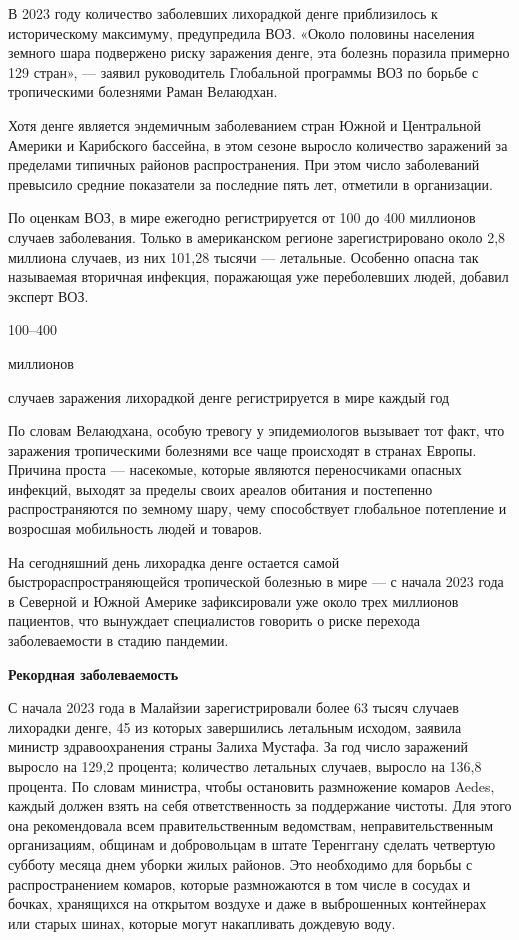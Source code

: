 В 2023 году количество заболевших лихорадкой денге приблизилось к историческому максимуму, предупредила ВОЗ. «Около половины населения земного шара подвержено риску заражения денге, эта болезнь поразила примерно 129 стран», — заявил руководитель Глобальной программы ВОЗ по борьбе с тропическими болезнями Раман Велаюдхан.

Хотя денге является эндемичным заболеванием стран Южной и Центральной Америки и Карибского бассейна, в этом сезоне выросло количество заражений за пределами типичных районов распространения. При этом число заболеваний превысило средние показатели за последние пять лет, отметили в организации.

По оценкам ВОЗ, в мире ежегодно регистрируется от 100 до 400 миллионов случаев заболевания. Только в американском регионе зарегистрировано около 2,8 миллиона случаев, из них 101,28 тысячи — летальные. Особенно опасна так называемая вторичная инфекция, поражающая уже переболевших людей, добавил эксперт ВОЗ.

\vspace*{1em}
\begin{center}
    {\Huge 100--400}

    {\Large миллионов}

    случаев заражения лихорадкой денге регистрируется в мире каждый год
\end{center}
\vspace*{1em}

По словам Велаюдхана, особую тревогу у эпидемиологов вызывает тот факт, что заражения тропическими болезнями все чаще происходят в странах Европы. Причина проста — насекомые, которые являются переносчиками опасных инфекций, выходят за пределы своих ареалов обитания и постепенно распространяются по земному шару, чему способствует глобальное потепление и возросшая мобильность людей и товаров.

На сегодняшний день лихорадка денге остается самой быстрораспространяющейся тропической болезнью в мире — с начала 2023 года в Северной и Южной Америке зафиксировали уже около трех миллионов пациентов, что вынуждает специалистов говорить о риске перехода заболеваемости в стадию пандемии.



\textbf{Рекордная заболеваемость}

С начала 2023 года в Малайзии зарегистрировали более 63 тысяч случаев лихорадки денге, 45 из которых завершились летальным исходом, заявила министр здравоохранения страны Залиха Мустафа. За год число заражений выросло на 129,2 процента; количество летальных случаев, выросло на 136,8 процента. По словам министра, чтобы остановить размножение комаров Aedes, каждый должен взять на себя ответственность за поддержание чистоты. Для этого она рекомендовала всем правительственным ведомствам, неправительственным организациям, общинам и добровольцам в штате Теренггану сделать четвертую субботу месяца днем уборки жилых районов. Это необходимо для борьбы с распространением комаров, которые размножаются в том числе в сосудах и бочках, хранящихся на открытом воздухе и даже в выброшенных контейнерах или старых шинах, которые могут накапливать дождевую воду.

